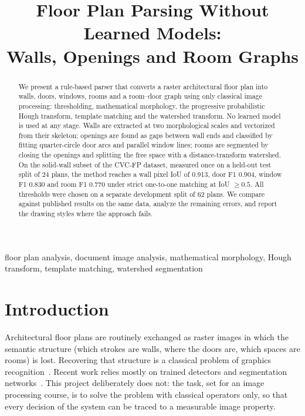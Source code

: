 \documentclass[conference]{IEEEtran}
\begin{document}
\title{Floor Plan Parsing Without Learned Models:\\
Walls, Openings and Room Graphs}

\author{
}

\maketitle

\begin{abstract}
We present a rule-based parser that converts a raster architectural floor
plan into walls, doors, windows, rooms and a room--door graph using only
classical image processing: thresholding, mathematical morphology, the
progressive probabilistic Hough transform, template matching and the
watershed transform. No learned model is used at any stage. Walls are
extracted at two morphological scales and vectorized from their skeleton;
openings are found as gaps between wall ends and classified by fitting
quarter-circle door arcs and parallel window lines; rooms are segmented by
closing the openings and splitting the free space with a distance-transform
watershed. On the solid-wall subset of the CVC-FP dataset, measured once on a
held-out test split of 24 plans, the method reaches a wall pixel IoU of
0.913, door F1 0.904, window F1 0.830 and room F1 0.770 under strict
one-to-one matching at IoU $\geq 0.5$. All thresholds were chosen on a
separate development split of 62 plans. We compare against published
results on the same data, analyze the remaining errors, and report the
drawing styles where the approach fails.
\end{abstract}

\begin{IEEEkeywords}
floor plan analysis, document image analysis, mathematical morphology,
Hough transform, template matching, watershed segmentation
\end{IEEEkeywords}

\section{Introduction}

Architectural floor plans are routinely exchanged as raster images in which
the semantic structure (which strokes are walls, where the doors are, which
spaces are rooms) is lost. Recovering that structure is a classical problem
of graphics recognition~\cite{mace2010rooms,ahmed2011improved,delasheras2014statistical}.
Recent work relies mostly on trained detectors and segmentation
networks~\cite{dodge2017parsing,liu2017raster,kalervo2019cubicasa,santhosh2026flooryolo}.
This project deliberately does not: the task, set for an image processing
course, is to solve the problem with classical operators only, so that every
decision of the system can be traced to a measurable image property.
\end{document}
